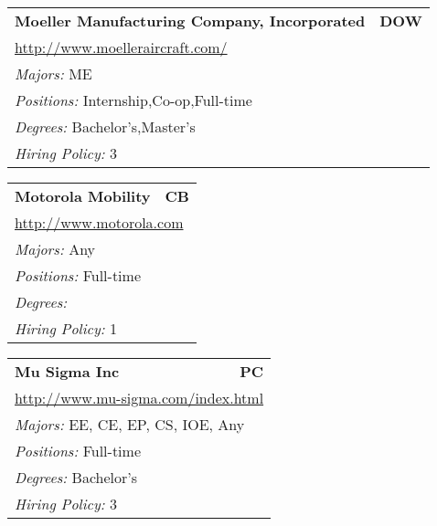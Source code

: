 \documentclass[twoside]{article}
\begin{document}
\begin{center}
\begin{multicols}{3}
\begin{FlushLeft}
\begin{minipage}{.9\columnwidth}
\end{minipage}
 
\begin{minipage}{.9\columnwidth}\begin{tabularx}{.95\columnwidth}{Xr}
                 {\Large\bf Moeller Manufacturing Company, Incorporated} & {\Large\bf DOW}\\
    \multicolumn{2}{p{.95\columnwidth}}{\url{http://www.moelleraircraft.com/}}\\
    \multicolumn{2}{p{.95\columnwidth}}{\emph{Majors:} ME}\\
    \multicolumn{2}{p{.95\columnwidth}}{\emph{Positions:} Internship,Co-op,Full-time}\\
    \multicolumn{2}{p{.95\columnwidth}}{\emph{Degrees:} Bachelor's,Master's}\\
    \multicolumn{2}{p{.95\columnwidth}}{\emph{Hiring Policy:} 3}\\
    \end{tabularx}
    
\end{minipage}
 
\begin{minipage}{.9\columnwidth}\begin{tabularx}{.95\columnwidth}{Xr}
                 {\Large\bf Motorola Mobility} & {\Large\bf CB}\\
    \multicolumn{2}{p{.95\columnwidth}}{\url{http://www.motorola.com}}\\
    \multicolumn{2}{p{.95\columnwidth}}{\emph{Majors:} Any}\\
    \multicolumn{2}{p{.95\columnwidth}}{\emph{Positions:} Full-time}\\
    \multicolumn{2}{p{.95\columnwidth}}{\emph{Degrees:} }\\
    \multicolumn{2}{p{.95\columnwidth}}{\emph{Hiring Policy:} 1}\\
    \end{tabularx}
    
\end{minipage}
 
\begin{minipage}{.9\columnwidth}\begin{tabularx}{.95\columnwidth}{Xr}
                 {\Large\bf Mu Sigma Inc} & {\Large\bf PC}\\
    \multicolumn{2}{p{.95\columnwidth}}{\url{http://www.mu-sigma.com/index.html}}\\
    \multicolumn{2}{p{.95\columnwidth}}{\emph{Majors:} EE, CE, EP, CS, IOE, Any}\\
    \multicolumn{2}{p{.95\columnwidth}}{\emph{Positions:} Full-time}\\
    \multicolumn{2}{p{.95\columnwidth}}{\emph{Degrees:} Bachelor's}\\
    \multicolumn{2}{p{.95\columnwidth}}{\emph{Hiring Policy:} 3}\\
    \end{tabularx}
    

\end{minipage}
\end{FlushLeft}
\end{multicols}
\end{center}
\end{document}
